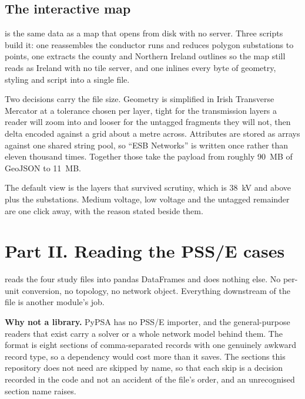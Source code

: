 \documentclass[11pt,a4paper]{article}
\begin{document}
\subsection{The interactive map}

 is the same data as a map that
opens from disk with no server. Three scripts build it: one reassembles the
conductor runs and reduces polygon substations to points, one extracts the
county and Northern Ireland outlines so the map still reads as Ireland with no
tile server, and one inlines every byte of geometry, styling and script into a
single file.

Two decisions carry the file size. Geometry is simplified in Irish Transverse
Mercator at a tolerance chosen per layer, tight for the transmission layers a
reader will zoom into and looser for the untagged fragments they will not, then
delta encoded against a grid about a metre across. Attributes are stored as
arrays against one shared string pool, so ``ESB Networks'' is written once
rather than eleven thousand times. Together those take the payload from roughly
90~MB of GeoJSON to 11~MB.

The default view is the layers that survived scrutiny, which is 38~kV and above
plus the substations. Medium voltage, low voltage and the untagged remainder
are one click away, with the reason stated beside them.


\clearpage
\section{Part II. Reading the PSS/E cases}
\label{sec:psse}

 reads the four study files into pandas DataFrames and does
nothing else. No per-unit conversion, no topology, no network object.
Everything downstream of the file is another module's job.

\textbf{Why not a library.} PyPSA has no PSS/E importer, and the
general-purpose readers that exist carry a solver or a whole network model
behind them. The format is eight sections of comma-separated records with one
genuinely awkward record type, so a dependency would cost more than it saves.
The sections this repository does not need are skipped by name, so that
each skip is a decision recorded in the code and not an accident of the file's
order, and an unrecognised section name raises.
\end{document}

